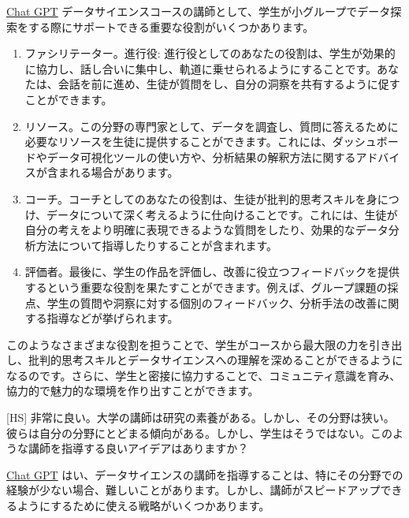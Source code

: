 \documentclass[
]{bxjsbook}
\theoremstyle{definition}
\theoremstyle{definition}
\theoremstyle{definition}
\theoremstyle{definition}
\theoremstyle{remark}
\begin{document}
\protect\hyperlink{chatgpt}{Chat GPT} データサイエンスコースの講師として、学生が小グループでデータ探索をする際にサポートできる重要な役割がいくつかあります。

\begin{enumerate}
\def\labelenumi{\arabic{enumi}.}
\item
  ファシリテーター。進行役: 進行役としてのあなたの役割は、学生が効果的に協力し、話し合いに集中し、軌道に乗せられるようにすることです。あなたは、会話を前に進め、生徒が質問をし、自分の洞察を共有するように促すことができます。
\item
  リソース。この分野の専門家として、データを調査し、質問に答えるために必要なリソースを生徒に提供することができます。これには、ダッシュボードやデータ可視化ツールの使い方や、分析結果の解釈方法に関するアドバイスが含まれる場合があります。
\item
  コーチ。コーチとしてのあなたの役割は、生徒が批判的思考スキルを身につけ、データについて深く考えるように仕向けることです。これには、生徒が自分の考えをより明確に表現できるような質問をしたり、効果的なデータ分析方法について指導したりすることが含まれます。
\item
  評価者。最後に、学生の作品を評価し、改善に役立つフィードバックを提供するという重要な役割を果たすことができます。例えば、グループ課題の採点、学生の質問や洞察に対する個別のフィードバック、分析手法の改善に関する指導などが挙げられます。
\end{enumerate}

このようなさまざまな役割を担うことで、学生がコースから最大限の力を引き出し、批判的思考スキルとデータサイエンスへの理解を深めることができるようになるのです。さらに、学生と密接に協力することで、コミュニティ意識を育み、協力的で魅力的な環境を作り出すことができます。

{[}HS{]} 非常に良い。大学の講師は研究の素養がある。しかし、その分野は狭い。彼らは自分の分野にとどまる傾向がある。しかし、学生はそうではない。このような講師を指導する良いアイデアはありますか？

\protect\hyperlink{chatgpt}{Chat GPT} はい、データサイエンスの講師を指導することは、特にその分野での経験が少ない場合、難しいことがあります。しかし、講師がスピードアップできるようにするために使える戦略がいくつかあります。
\end{document}
